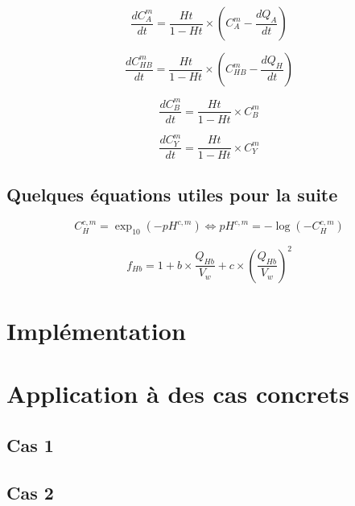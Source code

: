 \documentclass[a4paper,fleqn]{article}
\begin{document}
\begin{equation}
\frac{dC_{A}^m}{dt}={\frac{Ht}{1 - Ht}}\times{\left(C_{A}^m-\frac{dQ_{A}}{dt}\right)}
\end{equation}

\begin{equation}
\frac{dC_{HB}^m}{dt}={\frac{Ht}{1 - Ht}}\times{\left(C_{HB}^m-\frac{dQ_{H}}{dt}\right)}
\end{equation}

\begin{equation}
\frac{dC_{B}^m}{dt}={\frac{Ht}{1 - Ht}}\times{C_{B}^m}
\end{equation}

\begin{equation}
\frac{dC_{Y}^m}{dt}={\frac{Ht}{1 - Ht}}\times{C_{Y}^m}
\end{equation}

\subsection{Quelques équations utiles pour la suite}

\begin{equation}
{C_{H}^{c,m}=\exp_{10}{\left(-pH^{c,m}\right)}}\Longleftrightarrow{pH^{c,m}=-\log{\left(-C_{H}^{c,m}\right)}}
\end{equation}

\begin{equation}
f_{Hb}=1+{b}\times{\frac{Q_{Hb}}{V_w }}+{c}\times{\left(\frac{Q_{Hb}}{V_w }\right)^2}
\end{equation}

\section{Implémentation}   






\section{Application à des cas concrets}     

\subsection{Cas 1} 

\subsection{Cas 2} 
\end{document}
